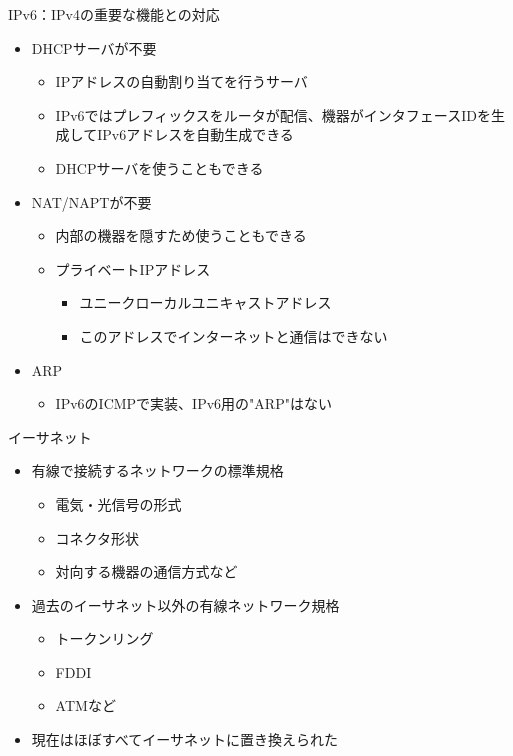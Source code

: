 \documentclass[12pt,aspectratio=169]{beamer}
\begin{document}
\begin{frame}{IPv6：IPv4の重要な機能との対応}

  \begin{itemize}
    \item DHCPサーバが不要
    \begin{itemize}
      \item IPアドレスの自動割り当てを行うサーバ %
      \item IPv6ではプレフィックスをルータが配信、機器がインタフェースIDを生成してIPv6アドレスを自動生成できる
      \item DHCPサーバを使うこともできる
    \end{itemize}
    \item NAT/NAPTが不要
    \begin{itemize}
      \item 内部の機器を隠すため使うこともできる
      \item プライベートIPアドレス
      \begin{itemize}
        \item ユニークローカルユニキャストアドレス
        \item このアドレスでインターネットと通信はできない
      \end{itemize}
    \end{itemize}
    \item ARP
    \begin{itemize}
      \item IPv6のICMPで実装、IPv6用の"ARP"はない
    \end{itemize}
  \end{itemize}

\end{frame}

\begin{frame}{イーサネット}

  \begin{itemize}
    \item 有線で接続するネットワークの標準規格
    \begin{itemize}
      \item 電気・光信号の形式
      \item コネクタ形状
      \item 対向する機器の通信方式など
    \end{itemize}
    \item 過去のイーサネット以外の有線ネットワーク規格
    \begin{itemize}
      \item トークンリング
      \item FDDI
      \item ATMなど
    \end{itemize}
    \item 現在はほぼすべてイーサネットに置き換えられた
  \end{itemize}

\end{frame}
\end{document}
